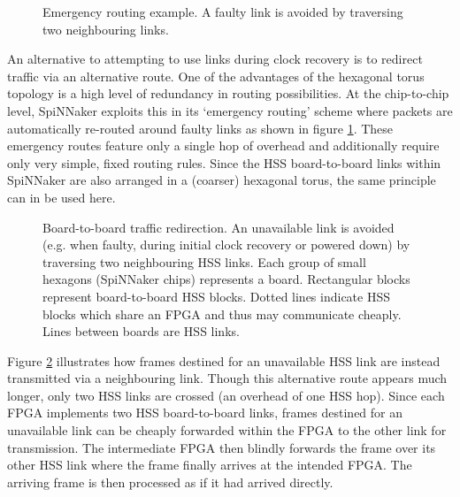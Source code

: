 			\begin{figure}
				\center
				
				
				\caption[Emergency routing example.]{Emergency routing example. A
				faulty link is avoided by traversing two neighbouring links.}
				\label{fig:emergency-routing}
			\end{figure}
			
			An alternative to attempting to use links during clock recovery is to
			redirect traffic via an alternative route. One of the advantages of the
			hexagonal torus topology is a high level of redundancy in routing
			possibilities.  At the chip-to-chip level, SpiNNaker exploits this in its
			`emergency routing' scheme where packets are automatically re-routed
			around faulty links as shown in figure \ref{fig:emergency-routing}. These
			emergency routes feature only a single hop of overhead and additionally
			require only very simple, fixed routing rules. Since the HSS
			board-to-board links within SpiNNaker are also arranged in a (coarser)
			hexagonal torus, the same principle can in be used here.
			
			\begin{figure}
				\center
				
				
				\caption[Board-to-board traffic redirection.]{Board-to-board traffic
				redirection. An unavailable link is avoided (e.g. when faulty, during
				initial clock recovery or powered down) by traversing two neighbouring
				HSS links. Each group of small hexagons (SpiNNaker chips) represents a
				board. Rectangular blocks represent board-to-board HSS blocks. Dotted
				lines indicate HSS blocks which share an FPGA and thus may communicate
				cheaply. Lines between boards are HSS links.}
				\label{fig:board-to-board-redirection}
			\end{figure}
			
			Figure \ref{fig:board-to-board-redirection} illustrates how frames
			destined for an unavailable HSS link are instead transmitted via a
			neighbouring link.  Though this alternative route appears much longer,
			only two HSS links are crossed (an overhead of one HSS hop). Since each
			FPGA implements two HSS board-to-board links, frames destined for an
			unavailable link can be cheaply forwarded within the FPGA to the other
			link for transmission. The intermediate FPGA then blindly forwards the
			frame over its other HSS link where the frame finally arrives at the
			intended FPGA. The arriving frame is then processed as if it had arrived
			directly.
			
